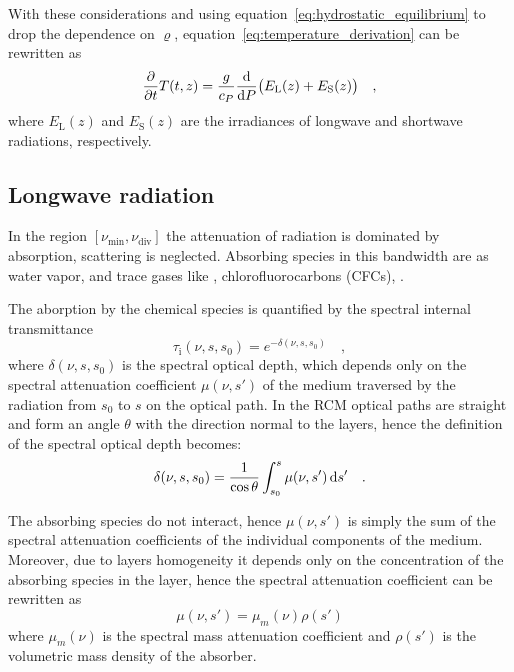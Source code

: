 \documentclass[a4paper,10pt,twocolumn,\classoptions]{article}
\begin{document}
With these considerations and using equation~\eqref{eq:hydrostatic_equilibrium} to drop the dependence on $\varrho$, equation~\eqref{eq:temperature_derivation} can be rewritten as
\begin{equation}
  \label{eq:temperature_time_derivative}
  \pdv*{T(t,z)}{t} = \frac{g}{c_P} \odv*{\big( E_\text{L}(z) + E_\text{S}(z) \big)}{P}
  \quad ,
\end{equation}
where $E_\text{L}(z)$ and $E_\text{S}(z)$ are the irradiances of longwave and shortwave radiations, respectively.



\subsection{Longwave radiation}
\label{sec:Longwave radiation}
In the region $[\nu_\text{min}, \nu_\text{div}]$ the attenuation of radiation is dominated by absorption, scattering is neglected.
Absorbing species in this bandwidth are  as water vapor,  and trace gases like , chlorofluorocarbons (CFCs), .

The aborption by the chemical species is quantified by the spectral internal transmittance
\begin{equation}
  \label{eq:spectral_internal_transmittance}
  \tau_\text{i}(\nu, s, s_0) = e^{-\delta(\nu, s, s_0)}
  \quad ,
\end{equation}
where $\delta(\nu, s, s_0)$ is the spectral optical depth, which depends only on the spectral attenuation coefficient $\mu(\nu, s')$ of the medium traversed by the radiation from $s_0$ to $s$ on the optical path. In the RCM optical paths are straight and form an angle $\theta$ with the direction normal to the layers, hence the definition of the spectral optical depth becomes:
\begin{equation}
  \label{eq:spectral_optical_depth}
  \delta(\nu, s, s_0) = \frac{1}{\cos \theta} \int_{s_0}^{s} \mu(\nu, s') \odif{s'}
  \quad .
\end{equation}

The absorbing species do not interact, hence $\mu(\nu, s')$ is simply the sum of the spectral attenuation coefficients of the individual components of the medium. Moreover, due to layers homogeneity it depends only on the concentration of the absorbing species in the layer, hence the spectral attenuation coefficient can be rewritten as
\begin{equation}
  \label{eq:spectral_attenuation_coefficient}
  \mu(\nu, s') = \mu_m(\nu) \rho(s')
\end{equation}
where $\mu_m(\nu)$ is the spectral mass attenuation coefficient and $\rho(s')$ is the volumetric mass density of the absorber.
\end{document}
